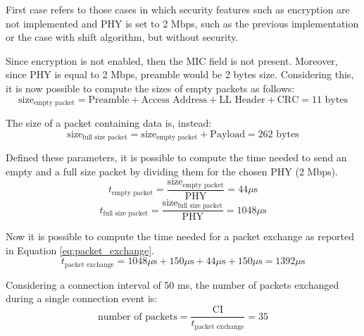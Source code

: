 \documentclass{Configuration_Files/PoliMi3i_thesis}
\begin{document}
First case refers to those cases in which security features such as encryption are not implemented and PHY is set to 2 Mbps, such as the previous implementation or the case with shift algorithm, but without security.

Since encryption is not enabled, then the MIC field is not present. Moreover, since PHY is equal to 2 Mbps, preamble would be 2 bytes size. Considering this, it is now possible to compute the sizes of empty packets as follows:
\begin{equation}
\text{size}_{\text{empty packet}} = \text{Preamble} + \text{Access Address} + \text{LL Header} + \text{CRC} = 11 \text{ bytes}
\label{eq:size_empty_packet}
\end{equation}

The size of a packet containing data is, instead:
\begin{equation}
\text{size}_{\text{full size packet}} = \text{size}_{\text{empty packet}} + \text{Payload} = 262 \text{ bytes}
\label{eq:size_full_size_packet}
\end{equation}

Defined these parameters, it is possible to compute the time needed to send an empty and a full size packet by dividing them for the chosen PHY (2 Mbps).
\begin{equation}
t_{\text{empty packet}} = \frac{\text{size}_{\text{empty packet}}}{\text{PHY}} = 44 \mu \text{s}
\label{eq:t_empty_packet}
\end{equation}
\begin{equation}
t_{\text{full size packet}} = \frac{\text{size}_{\text{full size packet}}}{\text{PHY}} = 1048 \mu \text{s}
\label{eq:t_full_size_packet}
\end{equation}

Now it is possible to compute the time needed for a packet exchange as reported in Equation \ref{eq:packet_exchange}.
\begin{equation}
t_{\text{packet exchange}} = 1048 \mu \text{s} + 150 \mu \text{s} + 44 \mu \text{s} + 150 \mu \text{s} = 1392 \mu \text{s}
\label{eq:packet_exchange_case1}
\end{equation}

Considering a connection interval of 50 ms, the number of packets exchanged during a single connection event is:
\begin{equation}
\text{number of packets} = \frac{\text{CI}}{t_{\text{packet exchange}}} = 35
\label{eq:number_of_packets_case1}
\end{equation}
\end{document}
